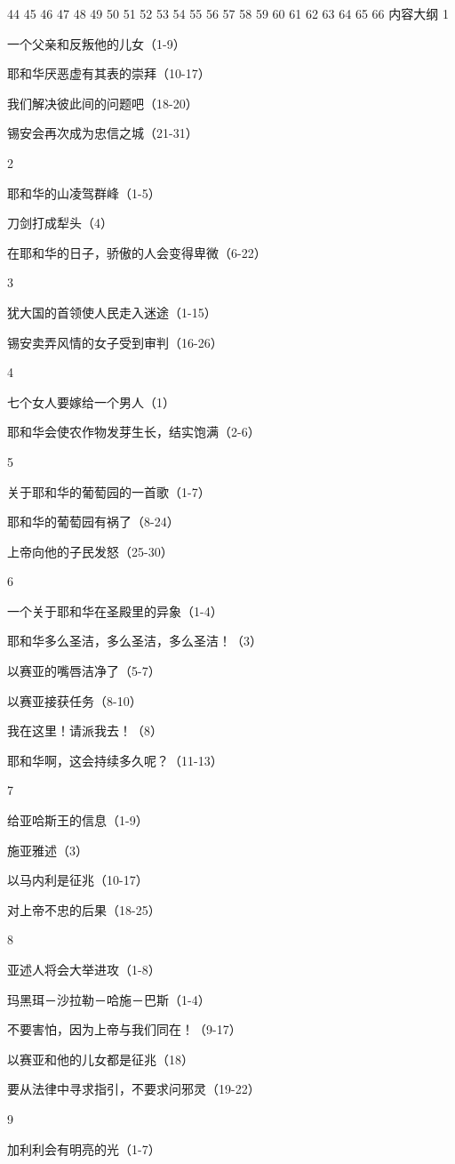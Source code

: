 
44
45
46
47
48
49
50
51
52
53
54
55
56
57
58
59
60
61
62
63
64
65
66
内容大纲
1

一个父亲和反叛他的儿女（1-9）

耶和华厌恶虚有其表的崇拜（10-17）

我们解决彼此间的问题吧（18-20）

锡安会再次成为忠信之城（21-31）

2

耶和华的山凌驾群峰（1-5）

刀剑打成犁头（4）

在耶和华的日子，骄傲的人会变得卑微（6-22）

3

犹大国的首领使人民走入迷途（1-15）

锡安卖弄风情的女子受到审判（16-26）

4

七个女人要嫁给一个男人（1）

耶和华会使农作物发芽生长，结实饱满（2-6）

5

关于耶和华的葡萄园的一首歌（1-7）

耶和华的葡萄园有祸了（8-24）

上帝向他的子民发怒（25-30）

6

一个关于耶和华在圣殿里的异象（1-4）

耶和华多么圣洁，多么圣洁，多么圣洁！（3）

以赛亚的嘴唇洁净了（5-7）

以赛亚接获任务（8-10）

我在这里！请派我去！（8）

耶和华啊，这会持续多久呢？（11-13）

7

给亚哈斯王的信息（1-9）

施亚雅述（3）

以马内利是征兆（10-17）

对上帝不忠的后果（18-25）

8

亚述人将会大举进攻（1-8）

玛黑珥－沙拉勒－哈施－巴斯（1-4）

不要害怕，因为上帝与我们同在！（9-17）

以赛亚和他的儿女都是征兆（18）

要从法律中寻求指引，不要求问邪灵（19-22）

9

加利利会有明亮的光（1-7）

